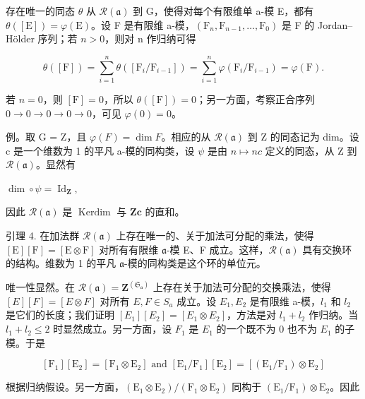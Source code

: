 存在唯一的同态 \(\theta\) 从 \(\mathcal{R}(\mathfrak{a})\) 到 G，使得对每个有限维单 a-模 E，都有 \(\theta([\mathrm{E}]) = \varphi(\mathrm{E})\)。设 F 是有限维 a-模，\((\mathrm{F}_{n}, \mathrm{F}_{n-1}, \ldots, \mathrm{F}_{0})\) 是 F 的 Jordan–Hölder 序列；若 \(n > 0\)，则对 n 作归纳可得

\[
\theta ([ \mathrm{F} ]) = \sum_ {i = 1} ^ {n} \theta ([ \mathrm{F} _ {i} / \mathrm{F} _ {i - 1} ]) = \sum_ {i = 1} ^ {n} \varphi (\mathrm{F} _ {i} / \mathrm{F} _ {i - 1}) = \varphi (\mathrm{F}).
\]

若 \(n = 0\)，则 \([\mathrm{F}] = 0\)，所以 \(\theta([\mathrm{F}]) = 0\)；另一方面，考察正合序列 \(0 \longrightarrow 0 \longrightarrow 0 \longrightarrow 0 \longrightarrow 0\)，可见 \(\varphi(0) = 0\)。

例。取 G = Z，且 \(\varphi(F) = \dim F\)。相应的从 \(\mathcal{R}(\mathfrak{a})\) 到 Z 的同态记为 dim。设 c 是一个维数为 1 的平凡 a-模的同构类，设 \(\psi\) 是由 \(n \mapsto nc\) 定义的同态，从 Z 到 \(\mathcal{R}(\mathfrak{a})\)。显然有

\(\dim \circ \psi = \operatorname{Id}_{\mathbf{Z}},\)

因此 \(\mathcal{R}(\mathfrak{a})\) 是 \(\operatorname{Kerdim}\) 与 \(\mathbf{Zc}\) 的直和。

引理 4. 在加法群 \(\mathcal{R}(\mathfrak{a})\) 上存在唯一的、关于加法可分配的乘法，使得 \([\mathrm{E}][\mathrm{F}] = [\mathrm{E}\otimes \mathrm{F}]\) 对所有有限维 \(\mathfrak{a}\)-模 E、F 成立。这样，\(\mathcal{R}(\mathfrak{a})\) 具有交换环的结构。维数为 1 的平凡 \(\mathfrak{a}\)-模的同构类是这个环的单位元。

唯一性显然。在 \(\mathcal{R}(\mathfrak{a}) = \mathbf{Z}^{(\mathfrak{S}_{\mathfrak{a}})}\) 上存在关于加法可分配的交换乘法，使得 \([E][F] = [E \otimes F]\) 对所有 \(E, F \in S_{a}\) 成立。设 \(E_{1}, E_{2}\) 是有限维 a-模，\(l_{1}\) 和 \(l_{2}\) 是它们的长度；我们证明 \([E_{1}][E_{2}] = [E_{1} \otimes E_{2}]\)，方法是对 \(l_{1} + l_{2}\) 作归纳。当 \(l_{1} + l_{2} \leq 2\) 时显然成立。另一方面，设 \(F_{1}\) 是 \(E_{1}\) 的一个既不为 0 也不为 \(E_{1}\) 的子模。于是

\[
[ \mathrm{F} _ {1} ] [ \mathrm{E} _ {2} ] = [ \mathrm{F} _ {1} \otimes \mathrm{E} _ {2} ] \text { and } [ \mathrm{E} _ {1} / \mathrm{F} _ {1} ] [ \mathrm{E} _ {2} ] = [ (\mathrm{E} _ {1} / \mathrm{F} _ {1}) \otimes \mathrm{E} _ {2} ]
\]

根据归纳假设。另一方面，\((\mathrm{E}_1\otimes \mathrm{E}_2) / (\mathrm{F}_1\otimes \mathrm{E}_2)\) 同构于 \((\mathrm{E}_1 / \mathrm{F}_1)\otimes \mathrm{E}_2\)。因此

